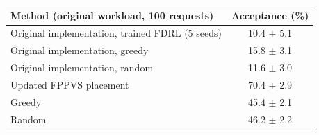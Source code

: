 \begin{tabular}{lc}
\toprule
Method (original workload, 100 requests) & Acceptance (\%) \\
\midrule
Original implementation, trained FDRL (5 seeds) & 10.4 $\pm$ 5.1 \\
Original implementation, greedy & 15.8 $\pm$ 3.1 \\
Original implementation, random & 11.6 $\pm$ 3.0 \\
\midrule
Updated FPPVS placement & 70.4 $\pm$ 2.9 \\
Greedy & 45.4 $\pm$ 2.1 \\
Random & 46.2 $\pm$ 2.2 \\
\bottomrule
\end{tabular}
